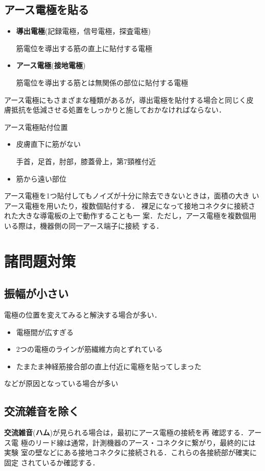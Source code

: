 \documentclass[10pt,twocolumn]{jarticle}
\begin{document}
\subsection{アース電極を貼る}
\begin{itemize}
\item {\bf 導出電極}(記録電極，信号電極，探査電極)

筋電位を導出する筋の直上に貼付する電極

\item {\bf アース電極}({\bf 接地電極})

筋電位を導出する筋とは無関係の部位に貼付する電極
\end{itemize}

アース電極にもさまざまな種類があるが，導出電極を貼付する場合と同じく皮
膚抵抗を低減させる処置をしっかりと施しておかなければならない．

アース電極貼付位置
\begin{itemize}
\item 皮膚直下に筋がない

手首，足首，肘部，膝蓋骨上，第7頸椎付近
\item 筋から遠い部位
\end{itemize}

アース電極を1つ貼付してもノイズが十分に除去できないときは，面積の大き
いアース電極を用いたり，複数個貼付する．
裸足になって接地コネクタに接続された大きな導電板の上で動作することも一
案．ただし，アース電極を複数個用いる際は，機器側の同一アース端子に接続
する．


\section{諸問題対策}
\subsection{振幅が小さい}
電極の位置を変えてみると解決する場合が多い．
\begin{itemize}
\item 電極間が広すぎる
\item 2つの電極のラインが筋繊維方向とずれている
\item たまたま神経筋接合部の直上付近に電極を貼ってしまった
\end{itemize}
などが原因となっている場合が多い

\subsection{交流雑音を除く}
{\bf 交流雑音}({\bf ハム})が見られる場合は，最初にアース電極の接続を再
確認する．アース電
極のリード線は通常，計測機器のアース・コネクタに繋がり，最終的には実験
室の壁などにある接地コネクタに接続される．これらの各接続部が確実に固定
されているか確認する．
\end{document}
